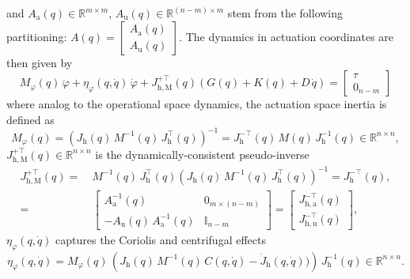 and $A_\mathrm{a}(q) \in \mathbb{R}^{m \times m}$, $A_\mathrm{u}(q) \in \mathbb{R}^{(n-m) \times m}$ stem from the following partitioning: $A(q) = \begin{bmatrix}
    A_\mathrm{a}(q)\\ A_\mathrm{u}(q)
\end{bmatrix}$.
The dynamics in actuation coordinates are then given by
\begin{equation}
    M_\varphi(q) \, \ddot{\varphi} + \eta_\varphi(q,\dot{q}) \, \dot{\varphi} + J_{\mathrm{h},\mathrm{M}}^{+\top}(q) \left ( G(q) + K(q) + D \, \dot{q} \right ) = \begin{bmatrix}
        \tau\\ 0_{n-m}
    \end{bmatrix}
\end{equation}
where analog to the operational space dynamics, the actuation space inertia is defined as~\citep{khatib1987unified}
\begin{equation}\label{eq:background:dynamics:eom_actuation_coordinates}
    M_\varphi(q) = \left ( J_\mathrm{h}(q) \, M^{-1}(q) \, J_\mathrm{h}^\top(q) \right )^{-1} = J_\mathrm{h}^{-\top}(q) \, M(q) \, J_\mathrm{h}^{-1}(q) \in \mathbb{R}^{n \times n},
\end{equation}
$J_{\mathrm{h},\mathrm{M}}^{+\top}(q) \in \mathbb{R}^{n \times n}$ is the dynamically-consistent pseudo-inverse~\citep{chang1995manipulator}
\begin{equation}
\begin{split}
    J_{\mathrm{h},\mathrm{M}}^{+\top}(q) =& \: M^{-1}(q) \, J_\mathrm{h}^\top(q) \left ( J_\mathrm{h}(q) \, M^{-1}(q) \, J_\mathrm{h}^\top(q) \right )^{-1} = J_\mathrm{h}^{-\top}(q),\\
    =& \: \begin{bmatrix}
        A_\mathrm{a}^{-1}(q) & 0_{m \times (n-m)}\\
        -A_\mathrm{u}(q) \, A_\mathrm{a}^{-1}(q) & \mathbb{I}_{n-m}
    \end{bmatrix} = \begin{bmatrix}
        J_{\mathrm{h},\mathrm{a}}^{-\top}(q)\\
        J_{\mathrm{h},\mathrm{u}}^{-\top}(q)
    \end{bmatrix},
\end{split}
\end{equation}
$\eta_\varphi(q,\dot{q})$ captures the Coriolis and centrifugal effects
\begin{equation}
    \eta_\varphi(q, \dot{q}) = M_\varphi(q) \, \left ( J_\mathrm{h}(q) \, M^{-1}(q) \, C(q,\dot{q}) - \dot{J}_\mathrm{h}(q,\dot{q})) \right ) \, J_\mathrm{h}^{-1}(q) \in \mathbb{R}^{n \times n}.
\end{equation}
